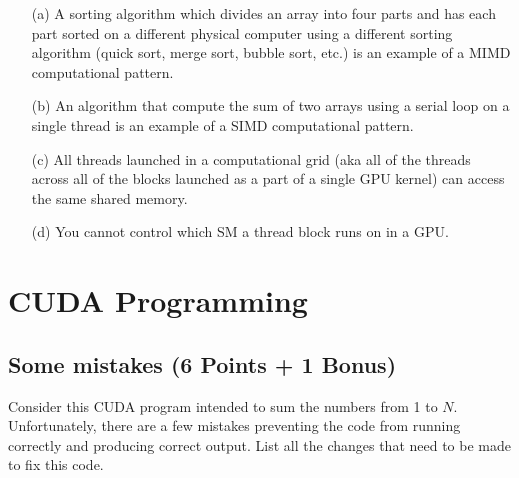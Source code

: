 \documentclass[]{article}
\begin{document}
\begin{enumerate}
    \item[(a)] A sorting algorithm which divides an array into four parts and has each part sorted on a different physical computer using a different sorting algorithm (quick sort, merge sort, bubble sort, etc.) is an example of a MIMD computational pattern.
    \item[(b)] An algorithm that compute the sum of two arrays using a serial loop on a single thread is an example of a SIMD computational pattern.
    \item[(c)] All threads launched in a computational grid (aka all of the threads across all of the blocks launched as a part of a single GPU kernel) can access the same shared memory.
    \item[(d)] You cannot control which SM a thread block runs on in a GPU.
\end{enumerate}

\bigskip




\newpage

\section{CUDA Programming}
\subsection{Some mistakes (6 Points + 1 Bonus)}
Consider this CUDA program intended to sum the numbers from 1 to $N$. Unfortunately, there are a few mistakes preventing the code from running correctly and producing correct output. List all the changes that need to be made to fix this code.
\end{document}
